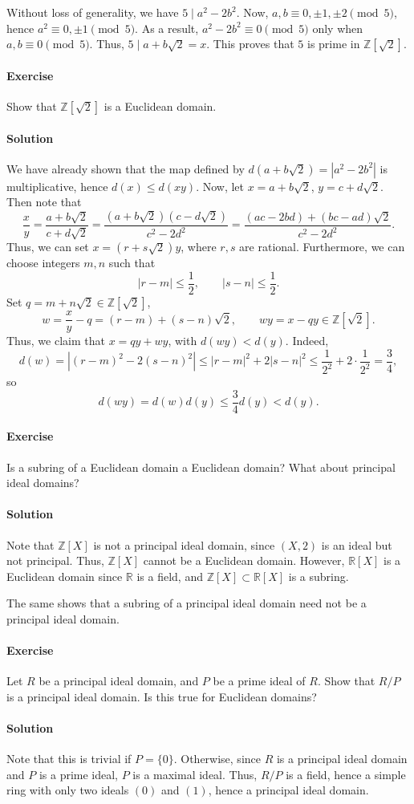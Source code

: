 \documentclass[10pt]{article}
\newcounter{prob}
\newcommand{\problem}{\stepcounter{prob}\paragraph{Exercise \arabic{prob}}}
\newcommand{\solution}{\paragraph{Solution}}
\newcommand{\R}{\mathbb{R}}
\newcommand{\Z}{\mathbb{Z}}
\begin{document}
    Without loss of generality, we have $5\mid a^2 - 2b^2$. Now, $a, b \equiv 0, \pm
    1, \pm 2 \pmod{5}$, hence $a^2 \equiv 0, \pm 1 \pmod{5}$. As a result, $a^2 -
    2b^2 \equiv 0\pmod{5}$ only when $a, b \equiv 0 \pmod{5}$. Thus, $5\mid a +
    b\sqrt{2} = x$. This proves that $5$ is prime in $\Z[\sqrt{2}]$.


    \problem Show that $\Z[\sqrt{2}]$ is a Euclidean domain.

    \solution We have already shown that the map defined by $d(a + b\sqrt{2}) = |a^2
    - 2b^2|$ is multiplicative, hence $d(x) \leq d(xy)$. Now, let $x = a +
    b\sqrt{2}$, $y = c + d\sqrt{2}$. Then note that \[
        \frac{x}{y} = \frac{a + b\sqrt{2}}{c + d\sqrt{2}} = \frac{(a + b\sqrt{2})(c -
        d\sqrt{2})}{c^2 - 2d^2} = \frac{(ac - 2bd) + (bc - ad)\sqrt{2}}{c^2 - 2d^2}.
    \] Thus, we can set $x = (r + s\sqrt{2})y$, where $r, s$ are rational.
    Furthermore, we can choose integers $m, n$ such that \[
        |r - m| \leq \frac{1}{2}, \qquad |s - n| \leq \frac{1}{2}.
    \] Set $q = m + n\sqrt{2} \in \Z[\sqrt{2}]$, \[
        w = \frac{x}{y} - q = (r - m) + (s - n)\sqrt{2}, \qquad wy = x - qy \in
        \Z[\sqrt{2}].
    \] Thus, we claim that $x = qy + wy$, with $d(wy) < d(y)$. Indeed, \[
        d(w) = |(r - m)^2 - 2(s - n)^2| \leq |r - m|^2 + 2|s - n|^2 \leq
        \frac{1}{2^2} + 2\cdot \frac{1}{2^2} = \frac{3}{4},
    \] so \[
        d(wy) = d(w)d(y) \leq \frac{3}{4} d(y) < d(y).
    \] 


    \problem Is a subring of a Euclidean domain a Euclidean domain? What about
    principal ideal domains?

    \solution Note that $\Z[X]$ is not a principal ideal domain, since $(X, 2)$ is an
    ideal but not principal. Thus, $\Z[X]$ cannot be a Euclidean domain. However,
    $\R[X]$ is a Euclidean domain since $\R$ is a field, and $\Z[X] \subset \R[X]$ is
    a subring.

    The same shows that a subring of a principal ideal domain need not be a principal
    ideal domain.


    \problem Let $R$ be a principal ideal domain, and $P$ be a prime ideal of $R$.
    Show that $R/P$ is a principal ideal domain. Is this true for Euclidean domains?

    \solution Note that this is trivial if $P = \{0\}$. Otherwise, since $R$ is a
    principal ideal domain and $P$ is a prime ideal, $P$ is a maximal ideal. Thus,
    $R/P$ is a field, hence a simple ring with only two ideals $(0)$ and $(1)$, hence
    a principal ideal domain.
\end{document}
